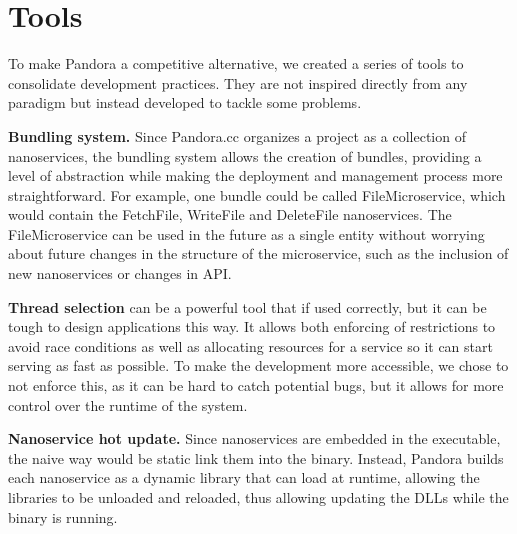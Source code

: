 \section{Tools}
To make Pandora a competitive alternative, we created a series of tools to consolidate development practices. They are not inspired directly from any paradigm but instead developed to tackle some problems.

\textbf{Bundling system.} Since Pandora.cc organizes a project as a collection of nanoservices, the bundling system allows the creation of bundles, providing a level of abstraction while making the deployment and management process more straightforward. For example, one bundle could be called FileMicroservice, which would contain the FetchFile, WriteFile and DeleteFile nanoservices. The FileMicroservice can be used in the future as a single entity without worrying about future changes in the structure of the microservice, such as the inclusion of new nanoservices or changes in API.

\textbf{Thread selection} can be a powerful tool that if used correctly, but it can be tough to design applications this way. It allows both enforcing of restrictions to avoid race conditions as well as allocating resources for a service so it can start serving as fast as possible. To make the development more accessible, we chose to not enforce this, as it can be hard to catch potential bugs, but it allows for more control over the runtime of the system.

\textbf{Nanoservice hot update.} Since nanoservices are embedded in the executable, the naive way would be static link them into the binary. Instead, Pandora builds each nanoservice as a dynamic library that can load at runtime, allowing the libraries to be unloaded and reloaded, thus allowing updating the DLLs while the binary is running. 